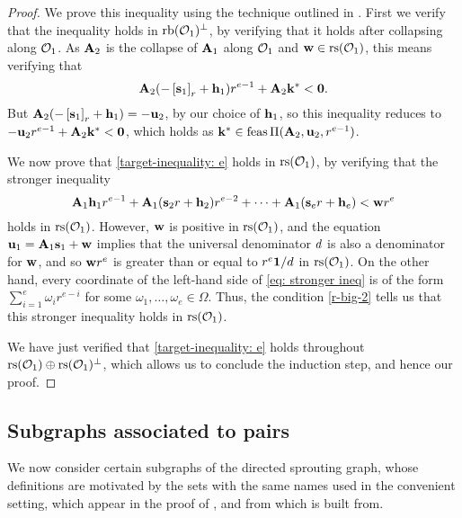 \documentclass{article}
\begin{document}
\begin{proof}
    We prove this inequality using the technique outlined in .
    First we verify that the inequality holds in $\operatorname{rb}(\mathcal{O}_1)^{\perp}$, by verifying that it holds after collapsing along $\mathcal{O}_1$.
    As $\mathbf{A}_2$ is the collapse of $\mathbf{A}_1$ along $\mathcal{O}_1$ and $\mathbf{w}\in \operatorname{rs}(\mathcal{O}_1)$, this means verifying that
    \[\mathbf{A}_2( - \left[ \mathbf{s}_1 \right]_r + \mathbf{h}_1 ) r^{e-1} + \mathbf{A}_2\mathbf{k}^{\ast} < \mathbf{0}.\]
    But $\mathbf{A}_2( - \left[ \mathbf{s}_1 \right]_r + \mathbf{h}_1 ) = -\mathbf{u}_2$, by our choice of $\mathbf{h}_1$, so this inequality reduces to $-\mathbf{u}_2 r^{e-1} + \mathbf{A}_2 \mathbf{k}^{\ast} < \mathbf{0}$, which holds as $\mathbf{k}^{\ast} \in \operatorname{feas} \Pi(\mathbf{A}_2, \mathbf{u}_2, r^{e-1})$.

    We now prove that \eqref{target-inequality: e} holds in $\operatorname{rs}(\mathcal{O}_1)$, by verifying that the stronger inequality
    \begin{equation}
       \mathbf{A}_1 \mathbf{h}_1 r^{e-1} + \mathbf{A}_1 (\mathbf{s}_2 r + \mathbf{h}_2)r^{e-2} + \cdots + \mathbf{A}_1 (\mathbf{s}_e r + \mathbf{h}_e ) < \mathbf{w}r^e
       \label{eq: stronger ineq}
    \end{equation}
    holds in $\operatorname{rs}(\mathcal{O}_1)$.
    However, $\mathbf{w}$ is positive in $\operatorname{rs}(\mathcal{O}_1)$, and the equation $\mathbf{u}_1 = \mathbf{A}_1 \mathbf{s}_1 + \mathbf{w}$ implies that the universal denominator $d$ is also a denominator for $\mathbf{w}$, and so $\mathbf{w} r^e$ is greater than or equal to $r^e \mathbf{1} / d$ in $\operatorname{rs}(\mathcal{O}_1)$.
    On the other hand, every coordinate of the left-hand side of \eqref{eq: stronger ineq} is of the form $\sum_{i=1}^{e} \omega_i  r^{e-i}$ for some $\omega_1, \ldots, \omega_e \in \Omega$.
    Thus, the condition \eqref{r-big-2} tells us that this stronger inequality holds in $\operatorname{rs}(\mathcal{O}_1)$.

    We have just verified that \eqref{target-inequality: e} holds throughout $\operatorname{rs}(\mathcal{O}_1) \oplus \operatorname{rs}(\mathcal{O}_1)^{\perp}$, which allows us to conclude the induction step, and hence our proof.
\end{proof}



\newpage
\subsection{Subgraphs associated to pairs}

We now consider certain subgraphs of the directed sprouting graph, whose definitions are motivated by the sets with the same names used in the convenient setting, which appear in the proof of , and from which  is built from.
\end{document}
